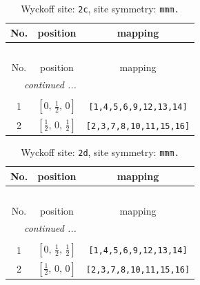 \documentclass[fleqn,8pt]{jsarticle}
\begin{document}
\renewcommand{\arraystretch}{1.2}
\begin{longtable}{ccc}
\caption{Wyckoff site: {\tt 2c}, site symmetry: {\tt mmm.}}
 \\
 \hline \hline
No. & position & mapping \\ \hline \endfirsthead

\multicolumn{2}{l}{\tablename\ \thetable{}} \\
 \hline \hline
No. & position & mapping \\ \hline \endhead

 \hline \hline
\multicolumn{2}{r}{\footnotesize\it continued ...} \\ \endfoot

 \hline \hline
\multicolumn{2}{r}{} \\ \endlastfoot

1 & $\left[ 0,\, \frac{1}{2},\, 0 \right]$ & {\tt [1,4,5,6,9,12,13,14]} \\ \hline
2 & $\left[ \frac{1}{2},\, 0,\, \frac{1}{2} \right]$ & {\tt [2,3,7,8,10,11,15,16]} \\
\end{longtable}
\renewcommand{\arraystretch}{1.2}
\begin{longtable}{ccc}
\caption{Wyckoff site: {\tt 2d}, site symmetry: {\tt mmm.}}
 \\
 \hline \hline
No. & position & mapping \\ \hline \endfirsthead

\multicolumn{2}{l}{\tablename\ \thetable{}} \\
 \hline \hline
No. & position & mapping \\ \hline \endhead

 \hline \hline
\multicolumn{2}{r}{\footnotesize\it continued ...} \\ \endfoot

 \hline \hline
\multicolumn{2}{r}{} \\ \endlastfoot

1 & $\left[ 0,\, \frac{1}{2},\, \frac{1}{2} \right]$ & {\tt [1,4,5,6,9,12,13,14]} \\ \hline
2 & $\left[ \frac{1}{2},\, 0,\, 0 \right]$ & {\tt [2,3,7,8,10,11,15,16]} \\
\end{longtable}
\renewcommand{\arraystretch}{1.2}
\end{document}
